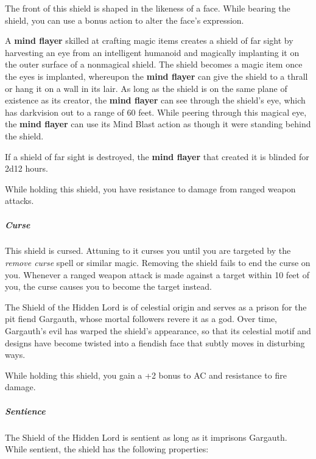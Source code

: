 \documentclass[10pt,a4paper,twoside,bg=print,twocolumn,openany,nodeprecatedcode]{dndbook}
\begin{document}
The front of this shield is shaped in the likeness of a face. While bearing the shield, you can use a bonus action to alter the face's expression.

A \textbf{mind flayer} skilled at crafting magic items creates a shield of far sight by harvesting an eye from an intelligent humanoid and magically implanting it on the outer surface of a nonmagical shield. The shield becomes a magic item once the eyes is implanted, whereupon the \textbf{mind flayer} can give the shield to a thrall or hang it on a wall in its lair. As long as the shield is on the same plane of existence as its creator, the \textbf{mind flayer} can see through the shield's eye, which has darkvision out to a range of 60 feet. While peering through this magical eye, the \textbf{mind flayer} can use its Mind Blast action as though it were standing behind the shield.

If a shield of far sight is destroyed, the \textbf{mind flayer} that created it is blinded for 2d12 hours.

While holding this shield, you have resistance to damage from ranged weapon attacks.

\subparagraph{Curse}
This shield is cursed. Attuning to it curses you until you are targeted by the \textit{remove curse} spell or similar magic. Removing the shield fails to end the curse on you. Whenever a ranged weapon attack is made against a target within 10 feet of you, the curse causes you to become the target instead.

The Shield of the Hidden Lord is of celestial origin and serves as a prison for the pit fiend Gargauth, whose mortal followers revere it as a god. Over time, Gargauth's evil has warped the shield's appearance, so that its celestial motif and designs have become twisted into a fiendish face that subtly moves in disturbing ways.

While holding this shield, you gain a +2 bonus to AC and resistance to fire damage.

\subparagraph{Sentience}
The Shield of the Hidden Lord is sentient as long as it imprisons Gargauth. While sentient, the shield has the following properties:
\end{document}
